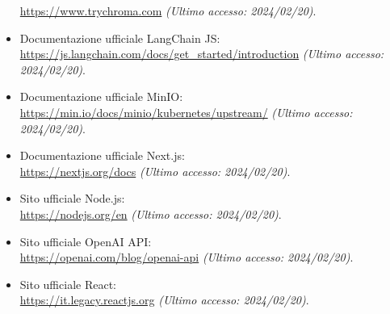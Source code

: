 \begin{itemize}
    \url{https://www.trychroma.com} \textit{(Ultimo accesso: 2024/02/20)}.
    \item Documentazione ufficiale LangChain JS: \\
    \url{https://js.langchain.com/docs/get_started/introduction} \textit{(Ultimo accesso: 2024/02/20)}.
    \item Documentazione ufficiale MinIO: \\
    \url{https://min.io/docs/minio/kubernetes/upstream/} \textit{(Ultimo accesso: 2024/02/20)}.
    \item Documentazione ufficiale Next.js: \\
    \url{https://nextjs.org/docs} \textit{(Ultimo accesso: 2024/02/20)}.
    \item Sito ufficiale Node.js: \\
    \url{https://nodejs.org/en} \textit{(Ultimo accesso: 2024/02/20)}.
    \item Sito ufficiale OpenAI API: \\
    \url{https://openai.com/blog/openai-api} \textit{(Ultimo accesso: 2024/02/20)}.
    \item Sito ufficiale React: \\
    \url{https://it.legacy.reactjs.org} \textit{(Ultimo accesso: 2024/02/20)}.
\end{itemize}
